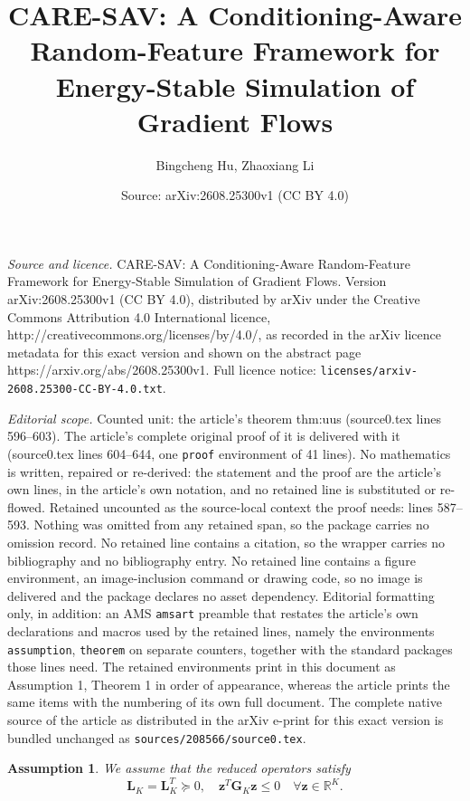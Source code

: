 \documentclass[10pt,a4paper]{amsart}
\title{CARE-SAV: A Conditioning-Aware Random-Feature Framework for Energy-Stable Simulation of Gradient Flows}
\author{Bingcheng Hu, Zhaoxiang Li}
\date{Source: arXiv:2608.25300v1 (CC BY 4.0)}
\newtheorem{assumption}{Assumption}
\begin{document}
\maketitle

\noindent\emph{Source and licence.} CARE-SAV: A Conditioning-Aware Random-Feature Framework for Energy-Stable Simulation of Gradient Flows. Version arXiv:2608.25300v1 (CC BY 4.0), distributed by arXiv under the Creative Commons Attribution 4.0 International licence, http://creativecommons.org/licenses/by/4.0/, as recorded in the arXiv licence metadata for this exact version and shown on the abstract page https://arxiv.org/abs/2608.25300v1. Full licence notice: \texttt{licenses/arxiv-2608.25300-CC-BY-4.0.txt}.\par\smallskip

\noindent\textit{Editorial scope.} Counted unit: the article's theorem thm:uus (source0.tex lines 596--603). The article's complete original proof of it is delivered with it (source0.tex lines 604--644, one \texttt{proof} environment of 41 lines). No mathematics is written, repaired or re-derived: the statement and the proof are the article's own lines, in the article's own notation, and no retained line is substituted or re-flowed.  Retained uncounted as the source-local context the proof needs: lines 587--593.  Nothing was omitted from any retained span, so the package carries no omission record.  No retained line contains a citation, so the wrapper carries no bibliography and no bibliography entry.  No retained line contains a figure environment, an image-inclusion command or drawing code, so no image is delivered and the package declares no asset dependency.  Editorial formatting only, in addition: an AMS \texttt{amsart} preamble that restates the article's own declarations and macros used by the retained lines, namely the environments \texttt{assumption}, \texttt{theorem} on separate counters, together with the standard packages those lines need.  The retained environments print in this document as Assumption 1, Theorem 1 in order of appearance, whereas the article prints the same items with the numbering of its own full document.  The complete native source of the article as distributed in the arXiv e-print for this exact version is bundled unchanged as \texttt{sources/208566/source0.tex}.
\begin{assumption}
\label{as1}
  We assume that the reduced operators satisfy
  \begin{equation}
    \boldsymbol{L}_K=\boldsymbol{L}_K^{T}\succeq0,\quad\boldsymbol z^{T}\boldsymbol{G}_K\boldsymbol z\le0 \quad \forall \boldsymbol z\in\mathbb R^K.
  \end{equation}
\end{assumption}
\end{document}
